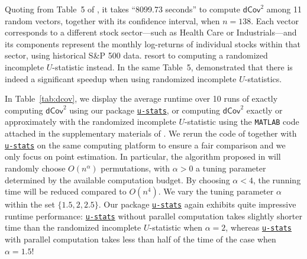 \documentclass[sn-mathphys, natbib=false]{sn-jnl}
\newcommand{\libref}[2]{\href{#2}{\texttt{#1}}}
\def\package{\libref{u-stats}{https://github.com/zrq1706/U-Statistics-Python}}
\theoremstyle{plain}
\theoremstyle{definition}
\newcommand{\Lin}[1]{{\color{purple}{#1}}}
\def\package{\libref{u-stats}{https://github.com/zrq1706/U-Statistics-Python}}
\begin{document}
\begin{bibunit}[agsm]
Quoting from Table~5 of \citet{shao2025u}, it takes ``8099.73 seconds'' to compute $\mathsf{dCov}^2$ among 11 random vectors, together with its confidence interval, when $n = 138$. Each vector corresponds to a different stock sector—such as Health Care or Industrials—and its components represent the monthly log-returns of individual stocks within that sector, using historical S\&P 500 data. \citet{shao2025u} resort to computing a randomized incomplete $U$-statistic instead. In the same Table~5, \citet{shao2025u} demonstrated that there is indeed a significant speedup when using randomized incomplete $U$-statistics. %

In Table~\ref{tab:dcov}, we display the average runtime over 10 runs of exactly computing $\mathsf{dCov}^2$ using our package \package{}, or computing $\mathsf{dCov}^2$ exactly or approximately with the randomized incomplete $U$-statistic using the \texttt{MATLAB} code attached in the supplementary materials of \citet{shao2025u}. We rerun the code of \citet{shao2025u} together with \package{} on the same computing platform to ensure a fair comparison and we only focus on point estimation. In particular, the algorithm proposed in \citet{shao2025u} will randomly choose $O (n^\alpha)$ %
permutations, with $\alpha > 0$ a tuning parameter determined by the available computation budget. By choosing $\alpha < 4$, the running time will be reduced compared to $O (n^{4})$. We vary the tuning parameter $\alpha$ within the set $\{1.5, 2, 2.5\}$. Our package \package{} again exhibits quite impressive runtime performance: \package{} without parallel computation takes slightly shorter time than the randomized incomplete $U$-statistic when $\alpha = 2$, whereas \package{} with parallel computation takes less than half of the time of the case when $\alpha = 1.5$!




\end{bibunit}
\end{document}

